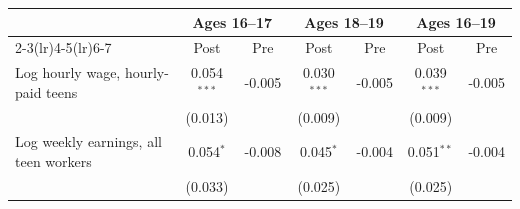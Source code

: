 \begin{tabular}{lcccccc}
\toprule
 & \multicolumn{2}{c}{Ages 16--17} & \multicolumn{2}{c}{Ages 18--19} & \multicolumn{2}{c}{Ages 16--19} \\
\cmidrule(lr){2-3}\cmidrule(lr){4-5}\cmidrule(lr){6-7}
 & Post & Pre & Post & Pre & Post & Pre \\
\midrule
Log hourly wage, hourly-paid teens & 0.054$^{***}$ & -0.005 & 0.030$^{***}$ & -0.005 & 0.039$^{***}$ & -0.005 \\
 & (0.013) &  & (0.009) &  & (0.009) &  \\
Log weekly earnings, all teen workers & 0.054$^{*}$ & -0.008 & 0.045$^{*}$ & -0.004 & 0.051$^{**}$ & -0.004 \\
 & (0.033) &  & (0.025) &  & (0.025) &  \\
\bottomrule
\end{tabular}
